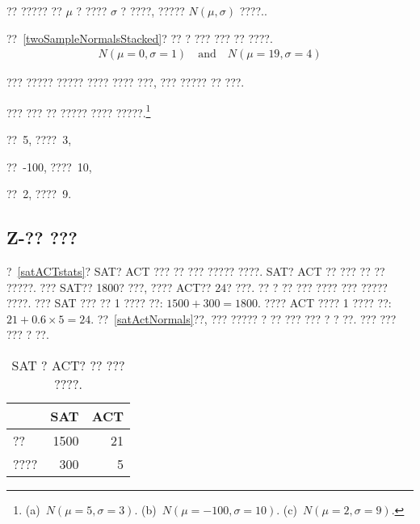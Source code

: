 ?? ????? ?? $\mu$ ? ???? $\sigma$ ? ????, ????? $N(\mu, \sigma)$ ????..

??~\ref{twoSampleNormalsStacked}? ?? ? ??? ??? ?? ????.
\begin{align*}
N(\mu=0,\sigma=1)\quad\text{and}\quad N(\mu=19,\sigma=4)
\end{align*}

??? ????? ????? ???? ???? ???, ??? ????? ?? ???.

\begin{exercise}

??? ??? ?? ????? ???? ?????.\footnote{(a)~$N(\mu=5,\sigma=3)$. (b)~$N(\mu=-100, \sigma=10)$. (c)~$N(\mu=2, \sigma=9)$.}
\begin{parts}
\item ??~5, ????~3,
\item ??~-100, ????~10, 
\item ??~2, ????~9.
\end{parts}
\end{exercise}

\subsection{Z-?? ???}

\begin{example}{
?~\vref{satACTstats}? SAT? ACT ??? ?? ??? ????? ????.
SAT? ACT ?? ??? ?? ?? ?????. ??? SAT?? 1800? ???, ???? ACT?? 24? ???. ?? ? ?? ??? ????}\label{actSAT}
??? ????? ????. ??? SAT ??? ?? 1 ???? ??: $1500 + 300=1800$. ???? ACT ???? 1 ???? ??: $21+0.6\times 5=24$. ??~\ref{satActNormals}??, ??? ????? ? ?? ??? ??? ? ? ??. ??? ??? ??? ? ??.
\end{example}

\begin{table}
\centering
\begin{tabular}{l r r}
  \hline
  & SAT & ACT \\
  \hline
?? \hspace{0.3cm} & 1500 & 21 \\
???? & 300 & 5 \\
   \hline
\end{tabular}
\caption{SAT ? ACT? ?? ??? ????.}
\label{satACTstats}
\end{table}

